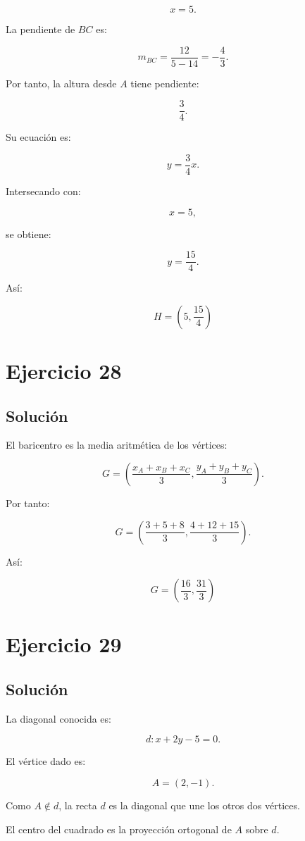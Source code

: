 \documentclass[11pt,a4paper]{article}
\begin{document}
\[
x=5.
\]

La pendiente de \(BC\) es:

\[
m_{BC}
=
\frac{12}{5-14}
=
-\frac43.
\]

Por tanto, la altura desde \(A\) tiene pendiente:

\[
\frac34.
\]

Su ecuación es:

\[
y=\frac34x.
\]

Intersecando con:

\[
x=5,
\]

se obtiene:

\[
y=\frac{15}{4}.
\]

Así:

\[
\boxed{
H=
\left(
5,
\frac{15}{4}
\right)
}
\]

\section{Ejercicio 28}
\subsection{Solución}

El baricentro es la media aritmética de los vértices:

\[
G
=
\left(
\frac{x_A+x_B+x_C}{3},
\frac{y_A+y_B+y_C}{3}
\right).
\]

Por tanto:

\[
G
=
\left(
\frac{3+5+8}{3},
\frac{4+12+15}{3}
\right).
\]

Así:

\[
\boxed{
G
=
\left(
\frac{16}{3},
\frac{31}{3}
\right)
}
\]

\section{Ejercicio 29}
\subsection{Solución}

La diagonal conocida es:

\[
d:
x+2y-5=0.
\]

El vértice dado es:

\[
A=(2,-1).
\]

Como \(A\notin d\), la recta \(d\) es la diagonal que une los otros dos vértices.

El centro del cuadrado es la proyección ortogonal de \(A\) sobre \(d\).
\end{document}
